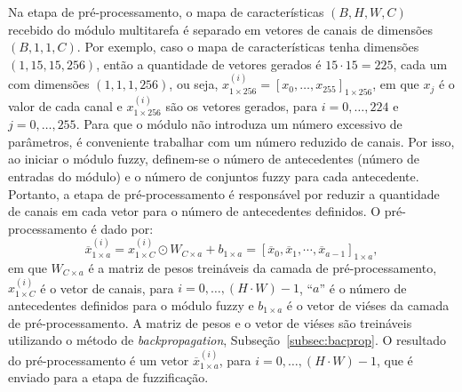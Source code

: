Na etapa de pré-processamento, o mapa de características $(B, H, W, C)$ recebido do módulo multitarefa é separado em vetores de canais de dimensões $(B, 1, 1, C)$. Por exemplo, caso o mapa de características tenha dimensões $(1,15,15,256)$, então a quantidade de vetores gerados é $15\cdot 15 = 225$, cada um com dimensões $(1,1,1,256)$, ou seja, $x^{(i)}_{1\times 256} = [x_0, \hdots, x_{255}]_{1\times 256}$, em que $x_j$ é o valor de cada canal e $x^{(i)}_{1\times 256}$ são os vetores gerados, para $i = 0, \hdots, 224$ e $j=0, \hdots, 255$. Para que o módulo não introduza um número excessivo de parâmetros, é conveniente trabalhar com um número reduzido de canais. Por isso, ao iniciar o módulo fuzzy, definem-se o número de antecedentes (número de entradas do módulo) e o número de conjuntos fuzzy para cada antecedente. Portanto, a etapa de pré-processamento é responsável por reduzir a quantidade de canais em cada vetor para o número de antecedentes definidos. O pré-processamento é dado por:
$$ 
\overline{x}^{(i)}_{1\times a} = x^{(i)}_{1\times C} \odot W_{C\times a} + b_{1\times a}  = [\overline{x}_0, \overline{x}_1, \cdots, \overline{x}_{a - 1}]_{1 \times a},
$$
em que $W_{C\times a}$ é a matriz de pesos treináveis da camada de pré-processamento, $x^{(i)}_{1\times C}$ é o vetor de canais, para $i=0, \hdots, (H\cdot W) - 1$, ``$a$'' é o número de antecedentes definidos para o módulo fuzzy e $b_{1\times a}$ é o vetor de viéses da camada de pré-processamento. A matriz de pesos e o vetor de viéses são treináveis utilizando o método de \textit{backpropagation}, Subseção~\ref{subsec:bacprop}. O resultado do pré-processamento é um vetor $\overline{x}^{(i)}_{1\times a}$, para $i=0, \hdots, (H\cdot W) - 1$, que é enviado para a etapa de fuzzificação.

